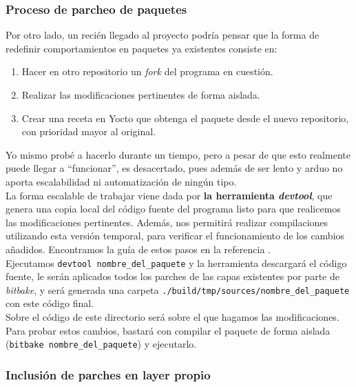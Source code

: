 \subsubsection{Proceso de parcheo de paquetes}

Por otro lado, un recién llegado al proyecto podría pensar que la forma de redefinir comportamientos en paquetes ya existentes consiste en:

\begin{enumerate}
	\item Hacer en otro repositorio un \textit{fork} del programa en cuestión.
	\item Realizar las modificaciones pertinentes de forma aislada.
	\item Crear una receta en Yocto que obtenga el paquete desde el nuevo repositorio, con prioridad mayor al original.
\end{enumerate}

Yo mismo probé a hacerlo durante un tiempo, pero a pesar de que esto realmente puede llegar a ``funcionar'', es desacertado, pues además de ser lento y arduo no aporta escalabilidad ni automatización de ningún tipo.\\

La forma escalable de trabajar viene dada por \textbf{la herramienta \textit{devtool}}, que genera una copia local del código fuente del programa listo para que realicemos las modificaciones pertinentes. Además, nos permitirá realizar compilaciones utilizando esta versión temporal, para verificar el funcionamiento de los cambios añadidos. Encontramos la guía de estos pasos en la referencia \cite{wiki-yocto-patches}.\\

Ejecutamos \texttt{devtool nombre\_del\_paquete} y la herramienta descargará el código fuente, le serán aplicados todos los parches de las capas existentes por parte de \textit{bitbake}, y será generada una carpeta \texttt{./build/tmp/sources/nombre\_del\_paquete} con este código final.\\

Sobre el código de este directorio será sobre el que hagamos las modificaciones. Para probar estos cambios, bastará con compilar el paquete de forma aislada (\texttt{bitbake nombre\_del\_paquete}) y ejecutarlo.\\

\subsubsection{Inclusión de parches en layer propio}

